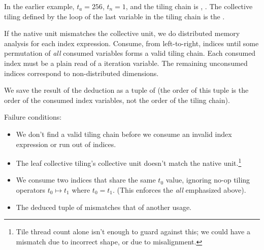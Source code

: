 \filbreak
In the earlier example, $t_a = 256$, $t_n = 1$, and the tiling chain is , .
The collective tiling defined by the  loop of the last variable in the tiling chain is the .

\filbreak
If the native unit mismatches the collective unit, we do distributed memory analysis for each index expression.
Consume, from left-to-right, indices until some permutation of \textit{all} %
consumed variables forms a valid tiling chain.
Each consumed index must be a plain read of a  iteration variable.
The remaining unconsumed indices correspond to non-distributed dimensions.

\filbreak
We save the result of the deduction as a tuple of  (the order of this tuple is the order of the consumed index variables, not the order of the tiling chain).

\filbreak
Failure conditions:
\begin{itemize}
  \item We don't find a valid tiling chain before we consume an invalid index expression or run out of indices.
  \filbreak
  \item The leaf collective tiling's collective unit doesn't match the native unit.\footnote{Tile thread count alone isn't enough to guard against this; we could have a mismatch due to incorrect shape, or due to misalignment.}
  \filbreak
  \item We consume two indices that share the same $t_0$ value, ignoring no-op tiling operators $t_0 \mapsto t_1$ where $t_0 = t_1$. (This enforces the \textit{all} emphasized above).
  \filbreak
  \item The deduced tuple of  mismatches that of another usage.
\end{itemize}

\filbreak
{}



\filbreak
{}



\filbreak
{}



\filbreak
{}


